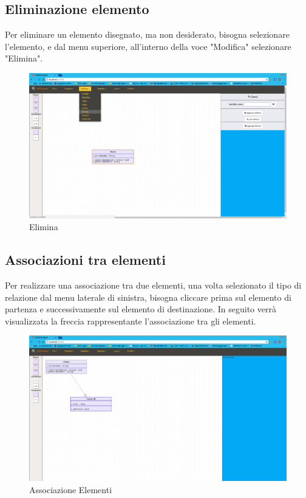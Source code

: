 \subsection{Eliminazione elemento}
Per eliminare un elemento disegnato, ma non desiderato, bisogna selezionare l'elemento, e dal menu superiore, all'interno della voce "Modifica" selezionare "Elimina".
\begin{figure}[h!]
	\centering
		\includegraphics[scale=0.22]{res/img/elimina.png}
	\caption{Elimina}
\end{figure}
\newpage

\subsection{Associazioni tra elementi}
Per realizzare una associazione tra due elementi, una volta selezionato il tipo di relazione dal menu laterale di sinistra, bisogna cliccare prima sul elemento di partenza e successivamente sul elemento di destinazione. In seguito verrà visualizzata la freccia rappresentante l'associazione tra gli elementi.
\begin{figure}[h!]
	\centering
		\includegraphics[scale=0.22]{res/img/associazioneElementi.png}
	\caption{Associazione Elementi}
\end{figure}